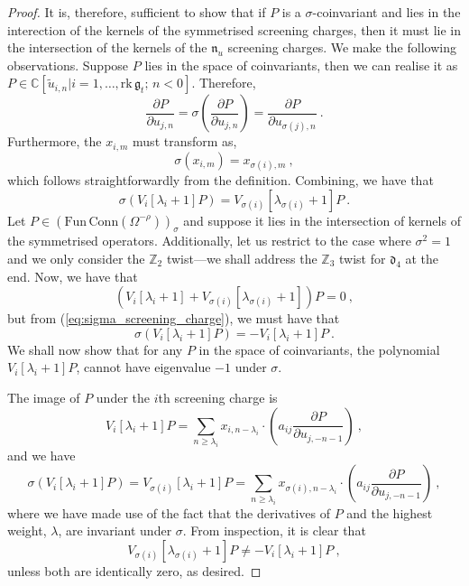 \documentclass[10pt,a4paper]{amsart}
\def\IC{\mathbb{C}}
\def\IZ{\mathbb{Z}}
\def\df{\mathfrak{d}}
\def\gf{\mathfrak{g}}
\begin{document}
\begin{proof}
It is, therefore, sufficient to show that if $P$ is a $\sigma$-coinvariant and lies in the interection of the kernels of the symmetrised screening charges, then it must lie in the intersection of the kernels of the $\mathfrak{n}_u$ screening charges.
We make the following observations. Suppose $P$ lies in the space of coinvariants, then we can realise it as $P\in\IC[\tilde{u}_{i,n}|i=1,\dots,\mathrm{rk}\,\gf_t;\,n<0]$. Therefore,
\begin{equation}
	\frac{\partial P}{\partial u_{j,n}} = \sigma \left( \frac{\partial P}{\partial u_{j,n}}\right) = \frac{\partial P}{\partial u_{\sigma(j),n}} ~.
\end{equation}
Furthermore, the $x_{i,m}$ must transform as,
\begin{equation}
	\sigma(x_{i,m}) = x_{\sigma(i),m}~,
\end{equation}
which follows straightforwardly from the definition. Combining, we have that
\begin{equation}\label{eq:sigma_screening_charge}
	\sigma\left(V_i[\lambda_i + 1] P\right) = V_{\sigma(i)}[\lambda_{\sigma(i)}+1]P~.
\end{equation}
Let $P\in(\mathrm{Fun\, Conn}(\Omega^{-\rho}))_\sigma$ and suppose it lies in the intersection of kernels of the symmetrised operators. Additionally, let us restrict to the case where $\sigma^2=1$ and we only consider the $\IZ_2$ twist---we shall address the $\IZ_3$ twist for $\df_4$ at the end. Now, we have that
\begin{equation}
	(V_{i}[\lambda_i+1] + V_{\sigma(i)}[\lambda_{\sigma(i)}+1])P = 0~,
\end{equation}
but from (\ref{eq:sigma_screening_charge}), we must have that
\begin{equation}
	\sigma\left(V_{i}[\lambda_i+1]P\right)=-V_{i}[\lambda_i+1]P~.
\end{equation}
We shall now show that for any $P$ in the space of coinvariants, the polynomial $V_i[\lambda_i+1]P$, cannot have eigenvalue $-1$ under $\sigma$.

The image of $P$ under the $i$th screening charge is
\begin{equation}
	V_i[\lambda_i +1]P = \sum_{n\ge\lambda_i} x_{i,n-\lambda_i}\cdot \left( a_{ij} \frac{\partial P}{\partial u_{j,-n-1}} \right)~,
\end{equation}
and we have
\begin{equation}
	\sigma \left( V_i[\lambda_i +1]P \right) = V_{\sigma(i)}[\lambda_{i}+1]P= \sum_{n\ge\lambda_{i}} x_{\sigma(i),n-\lambda_{i}}\cdot \left( a_{ij} \frac{\partial P}{\partial u_{j,-n-1}} \right)~,
\end{equation}
where we have made use of the fact that the derivatives of $P$ and the highest weight, $\lambda$, are invariant under $\sigma$. From inspection, it is clear that
\begin{equation}
	V_{\sigma(i)}[\lambda_{\sigma(i)}+1]P\neq- V_i[\lambda_i +1]P ~,
\end{equation}
unless both are identically zero, as desired.


\end{proof}
\end{document}
